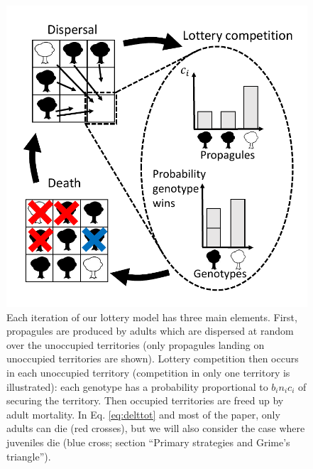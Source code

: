 \documentclass[11pt]{article}
\begin{document}
\begin{figure}
\centering
\includegraphics[scale=0.8]{lottery.pdf}
\caption{\label{fig:lottery} Each iteration of our lottery model has three main elements. First, propagules are produced by adults which are dispersed at random over the unoccupied territories (only propagules landing on unoccupied territories are shown). Lottery competition then occurs in each unoccupied territory (competition in only one territory is illustrated): each genotype has a probability proportional to $b_i n_i c_i$ of securing the territory. Then occupied territories are freed up by adult mortality. In Eq. \eqref{eq:delttot} and most of the paper, only adults can die (red crosses), but we will also consider the case where juveniles die (blue cross; section ``Primary strategies and Grime's triangle'').}
\end{figure}
\end{document}
